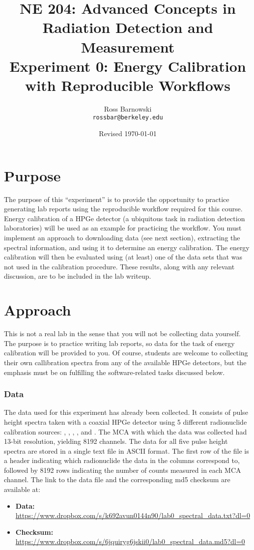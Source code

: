 \documentclass[11pt]{article}
\title{%
       NE 204: Advanced Concepts in Radiation Detection and \\ Measurement \\
       \Large\bf Experiment 0: Energy Calibration with Reproducible Workflows}
\author{Ross Barnowski \\ {\tt rossbar@berkeley.edu}}
\date{Revised \today}
\begin{document}
\maketitle

\section*{Purpose}

The purpose of this ``experiment'' is to provide the opportunity to practice 
generating lab reports using the reproducible workflow required for this
course. 
Energy calibration of a HPGe detector (a ubiquitous task in radiation detection
laboratories) will be used as an example for practicing the workflow.
You must implement an approach to downloading data (see next section), 
extracting the spectral information, and using it to determine an energy 
calibration. 
The energy calibration will then be evaluated using (at least) one of the data
sets that was not used in the calibration procedure.
These results, along with any relevant discussion, are to be included in the
lab writeup.

\section*{Approach}

This is not a real lab in the sense that you will not be collecting data 
yourself.
The purpose is to practice writing lab reports, so data for the task of
energy calibration will be provided to you.
Of course, students are welcome to collecting their own callibration spectra
from any of the available HPGe detectors, but the emphasis must be on 
fulfilling the software-related tasks discussed below.

\subsubsection*{Data}

The data used for this experiment has already been collected.
It consists of pulse height spectra taken with a coaxial HPGe detector using 
5 different radionuclide calibration sources: , ,
, , and .
The MCA with which the data was collected had 13-bit resolution, yielding 8192
channels.
The data for all five pulse height spectra are stored in a single text file in
ASCII format. 
The first row of the file is a header indicating which radionuclide the 
data in the columns correspond to, followed by 8192 rows indicating the number
of counts measured in each MCA channel.
The link to the data file and the corresponding md5 checksum are available at:
\begin{itemize}
  \item {\bf Data:} \url{https://www.dropbox.com/s/k692avun0144n90/lab0_spectral_data.txt?dl=0}
  \item {\bf Checksum:} \url{https://www.dropbox.com/s/6jquiryg6jskii0/lab0_spectral_data.md5?dl=0}
\end{itemize}
\end{document}
